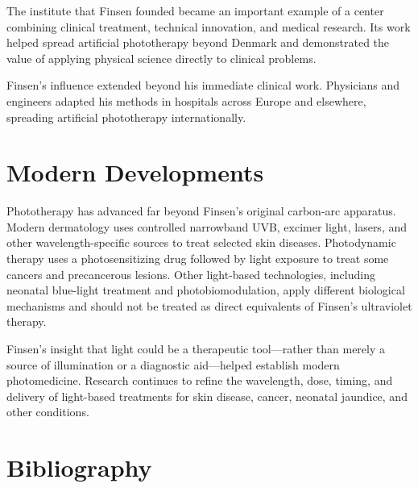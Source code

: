 The institute that Finsen founded became an important example of a center combining clinical treatment, technical innovation, and medical research. Its work helped spread artificial phototherapy beyond Denmark and demonstrated the value of applying physical science directly to clinical problems.

Finsen's influence extended beyond his immediate clinical work. Physicians and engineers adapted his methods in hospitals across Europe and elsewhere, spreading artificial phototherapy internationally.

\section{Modern Developments}

Phototherapy has advanced far beyond Finsen's original carbon-arc apparatus. Modern dermatology uses controlled narrowband UVB, excimer light, lasers, and other wavelength-specific sources to treat selected skin diseases. Photodynamic therapy uses a photosensitizing drug followed by light exposure to treat some cancers and precancerous lesions. Other light-based technologies, including neonatal blue-light treatment and photobiomodulation, apply different biological mechanisms and should not be treated as direct equivalents of Finsen's ultraviolet therapy.

Finsen's insight that light could be a therapeutic tool---rather than merely a source of illumination or a diagnostic aid---helped establish modern photomedicine. Research continues to refine the wavelength, dose, timing, and delivery of light-based treatments for skin disease, cancer, neonatal jaundice, and other conditions.


\section{Bibliography}

